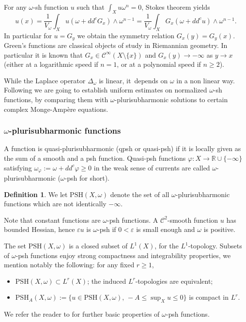 \documentclass[10pt]{amsart}
\theoremstyle{definition}
\newtheorem{defi}[theorem]{Definition}
\newcommand{\R}{\mathbb R}
\let\e\varepsilon
\let\f\varphi
\newcommand \PSH {\mathrm{PSH}}
\begin{document}
For any $\omega$-sh function $u$ such that $\int_X u \omega^n=0$, Stokes theorem yields
\[
u(x)=\frac{1}{V_{\omega}} \int_X u(\omega+dd^c G_x) \wedge \omega^{n-1}=\frac{1}{V_{\omega}} \int_X G_x (\omega+dd^c u) \wedge \omega^{n-1}.
\]
In particular for $u=G_y$ we obtain the symmetry relation $G_x(y)=G_y(x)$.
Green's functions are classical objects of study in Riemannian geometry. In particular it is known
that $G_x \in {\mathcal C}^{\infty}(X \setminus \{x \})$ and $G_x(y) \rightarrow -\infty$ as
$y \rightarrow x$ (either at a logarithmic speed if $n=1$, or at a polynomial speed if $n \geq 2$).

While the Laplace operator $\Delta_{\omega}$ is linear, it~depends on $\omega$ in a non linear way.
Following \cite{GPS22,GPSS22,GPSS23} we are going to establish uniform estimates on normalized
$\omega$-sh functions, by comparing them with $\omega$-plurisubharmonic solutions to certain complex Monge-Ampère equations.

\subsubsection{$\omega$-plurisubharmonic functions}

A function is quasi-plurisub\-harmonic (qpsh or quasi-psh) if it is locally given as the sum of a smooth and a psh function.
Quasi-psh functions
$\f:X \rightarrow \R \cup \{-\infty\}$ satisfying
$
\omega_{\f}:=\omega+dd^c \f \geq 0
$
in the weak sense of currents are called $\omega$-plurisubharmonic ($\omega$-psh for short).

\begin{defi}
We let $\PSH(X,\omega)$ denote the set of all $\omega$-plurisubharmonic functions which are not identically $-\infty$.
\end{defi}

Note that constant functions are $\omega$-psh functions.
A ${\mathcal C}^2$-smooth function $u$ has bounded Hessian, hence $\e u$ is
$\omega$-psh if $0<\e$ is small enough and $\omega$ is positive.

The set $\PSH(X,\omega)$ is a closed subset of $L^1(X)$, for the $L^1$-topology.
Subsets of $\omega$-psh functions enjoy strong compactness and integrability properties,
we mention notably the following: for any fixed $r \geq 1$,
\begin{itemize}
\item $\PSH(X,\omega) \subset L^r(X)$;
the induced $L^r$-topologies are equivalent;
\item $\PSH_A(X,\omega):=\{ u \in\PSH(X,\omega), \, -A \leq \sup_X u \leq 0 \}$ is compact in $L^r$.
\end{itemize}
We refer the reader to \cite{Dem12,GZbook} for further basic properties of $\omega$-psh functions.
\end{document}
